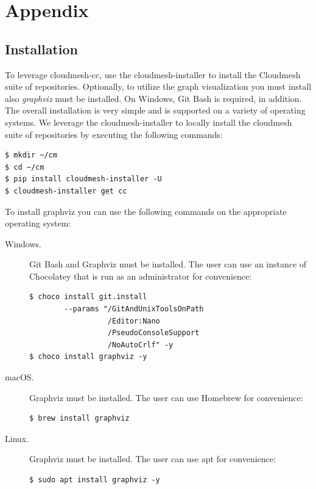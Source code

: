 \documentclass[sigplan,screen]{acmart}
\newcommand{\FILE}[1]{}
\begin{document}






\appendix

\section{Appendix}

% 

\FILE{installation.tex}

\subsection{Installation}\label{installation}

To leverage cloudmesh-cc, use the cloudmesh-installer to install the
Cloudmesh suite of repositories. Optionally, to utilize the graph
visualization you must install also {\em graphviz} must be
installed. On Windows, Git Bash is required, in addition. The overall
installation is very simple and is supported on a variety of operating
systems. We leverage the cloudmesh-installer to locally install the
cloudmesh suite of repositories by executing the following commands:

{\scriptsize\begin{verbatim}
$ mkdir ~/cm
$ cd ~/cm
$ pip install cloudmesh-installer -U
$ cloudmesh-installer get cc
\end{verbatim}}

To install graphviz you can use the following commands on the
appropriate operating system:

\begin{description}

\item[Windows.]  Git Bash and Graphviz must be installed. The user
can use an instance of Chocolatey that is run as an administrator for
convenience:

{\scriptsize\begin{verbatim}
$ choco install git.install
        --params "/GitAndUnixToolsOnPath
                  /Editor:Nano
                  /PseudoConsoleSupport
                  /NoAutoCrlf" -y
$ choco install graphviz -y
\end{verbatim}}

\item[macOS.] Graphviz must be installed. The user can use Homebrew
for convenience:

{\scriptsize\begin{verbatim}
$ brew install graphviz
\end{verbatim}}

\item[Linux.] Graphviz must be installed. The user can use apt for
convenience:

{\scriptsize\begin{verbatim}
$ sudo apt install graphviz -y
\end{verbatim}}

\end{description}
\end{document}
